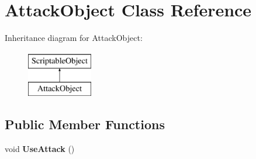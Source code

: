 \hypertarget{class_attack_object}{\section{Attack\-Object Class Reference}
\label{class_attack_object}
}
Inheritance diagram for Attack\-Object\-:\begin{figure}[H]
\begin{center}
\leavevmode
\includegraphics[height=2.000000cm]{class_attack_object}
\end{center}
\end{figure}
\subsection*{Public Member Functions}
\begin{DoxyCompactItemize}
\item 
\hypertarget{class_attack_object_a9d57cfc2f1cd8f3fac336e6eaa61de7b}{void {\bfseries Use\-Attack} ()}\label{class_attack_object_a9d57cfc2f1cd8f3fac336e6eaa61de7b}

\end{DoxyCompactItemize}
